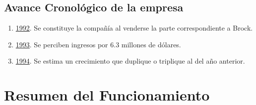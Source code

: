 \documentclass[12pt,a4paper,spanish]{article}
\begin{document}
\subsection{Avance Cronol\'{o}gico de la empresa}
\begin{enumerate}
	\item \underline{1992}. Se constituye la compa\~{n}\'{i}a al venderse la parte correspondiente a Brock. 
	\item \underline{1993}. Se perciben ingresos por 6.3 millones de d\'{o}lares.
	\item \underline{1994}. Se estima un crecimiento que duplique o triplique al del a\~{n}o anterior.
\end{enumerate}

\section{Resumen del Funcionamiento}
\end{document}
